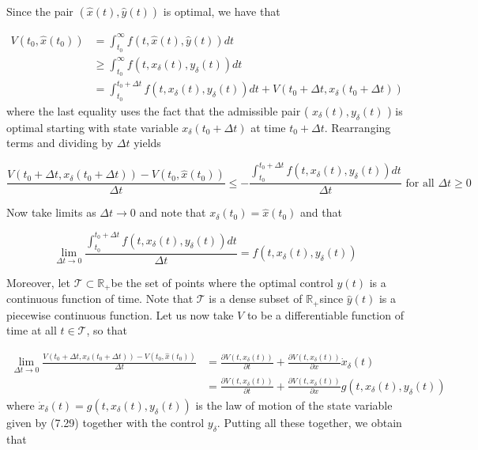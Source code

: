 \documentclass[\topdir/lecture_notes.tex]{subfiles}
\begin{document}
Since the pair $(\hat{x}(t), \hat{y}(t))$ is optimal, we have that

\[
\begin{aligned}
V\left(t_{0}, \hat{x}\left(t_{0}\right)\right) & =\int_{t_{0}}^{\infty} f(t, \hat{x}(t), \hat{y}(t)) d t \\
& \geq \int_{t_{0}}^{\infty} f\left(t, x_{\delta}(t), y_{\delta}(t)\right) d t \\
& =\int_{t_{0}}^{t_{0}+\Delta t} f\left(t, x_{\delta}(t), y_{\delta}(t)\right) d t+V\left(t_{0}+\Delta t, x_{\delta}\left(t_{0}+\Delta t\right)\right)
\end{aligned}
\]
where the last equality uses the fact that the admissible pair ( $x_{\delta}(t), y_{\delta}(t)$ ) is optimal starting with state variable $x_{\delta}\left(t_{0}+\Delta t\right)$ at time $t_{0}+\Delta t$. Rearranging terms and dividing by $\Delta t$ yields

\[
\frac{V\left(t_{0}+\Delta t, x_{\delta}\left(t_{0}+\Delta t\right)\right)-V\left(t_{0}, \hat{x}\left(t_{0}\right)\right)}{\Delta t} \leq-\frac{\int_{t_{0}}^{t_{0}+\Delta t} f\left(t, x_{\delta}(t), y_{\delta}(t)\right) d t}{\Delta t} \text { for all } \Delta t \geq 0
\]

Now take limits as $\Delta t \rightarrow 0$ and note that $x_{\delta}\left(t_{0}\right)=\hat{x}\left(t_{0}\right)$ and that

\[
\lim _{\Delta t \rightarrow 0} \frac{\int_{t_{0}}^{t_{0}+\Delta t} f\left(t, x_{\delta}(t), y_{\delta}(t)\right) d t}{\Delta t}=f\left(t, x_{\delta}(t), y_{\delta}(t)\right)
\]

Moreover, let $\mathcal{T} \subset \mathbb{R}_{+}$be the set of points where the optimal control $\hat{y}(t)$ is a continuous function of time. Note that $\mathcal{T}$ is a dense subset of $\mathbb{R}_{+}$since $\hat{y}(t)$ is a piecewise continuous function. Let us now take $V$ to be a differentiable function of time at all $t \in \mathcal{T}$, so that

\[
\begin{aligned}
\lim _{\Delta t \rightarrow 0} \frac{V\left(t_{0}+\Delta t, x_{\delta}\left(t_{0}+\Delta t\right)\right)-V\left(t_{0}, \hat{x}\left(t_{0}\right)\right)}{\Delta t} & =\frac{\partial V\left(t, x_{\delta}(t)\right)}{\partial t}+\frac{\partial V\left(t, x_{\delta}(t)\right)}{\partial x} \dot{x}_{\delta}(t) \\
& =\frac{\partial V\left(t, x_{\delta}(t)\right)}{\partial t}+\frac{\partial V\left(t, x_{\delta}(t)\right)}{\partial x} g\left(t, x_{\delta}(t), y_{\delta}(t)\right)
\end{aligned}
\]
where $\dot{x}_{\delta}(t)=g\left(t, x_{\delta}(t), y_{\delta}(t)\right)$ is the law of motion of the state variable given by (7.29) together with the control $y_{\delta}$. Putting all these together, we obtain that
\end{document}
